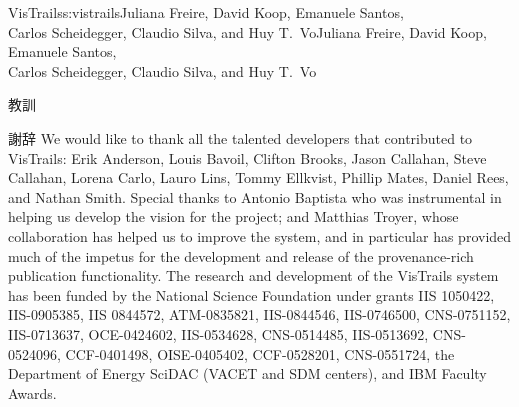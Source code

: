 \begin{aosachaptertoc}{VisTrails}{s:vistrails}{Juliana Freire, David Koop, Emanuele Santos, \\ Carlos Scheidegger, Claudio Silva, and Huy T.\ Vo}{Juliana Freire, David Koop, Emanuele Santos, \\ \hspace*{0.9cm} Carlos Scheidegger, Claudio Silva, and Huy T.\ Vo}
\begin{aosasect1}{教訓}
\begin{aosasect2}{謝辞}
We would like to thank all the talented developers that contributed to
VisTrails: Erik Anderson, Louis Bavoil, Clifton Brooks, Jason
Callahan, Steve Callahan, Lorena Carlo, Lauro Lins, Tommy Ellkvist,
Phillip Mates, Daniel Rees, and Nathan Smith. Special thanks to
Antonio Baptista who was instrumental in helping us develop the vision
for the project; and Matthias Troyer, whose collaboration has helped
us to improve the system, and in particular has provided much of the
impetus for the development and release of the provenance-rich
publication functionality. The research and development of the
VisTrails system has been funded by the National Science Foundation under grants IIS 1050422, IIS-0905385, IIS 0844572, ATM-0835821,
IIS-0844546, IIS-0746500, CNS-0751152, IIS-0713637, OCE-0424602,
IIS-0534628, CNS-0514485, IIS-0513692, CNS-0524096, CCF-0401498,
OISE-0405402, CCF-0528201, CNS-0551724,
the Department of Energy SciDAC (VACET and SDM centers), and IBM Faculty Awards.

\end{aosasect2}

\end{aosasect1}

\end{aosachaptertoc}
